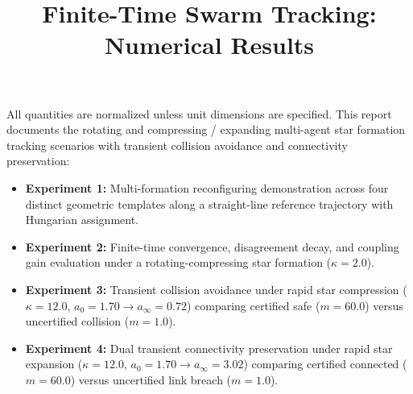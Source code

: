 \documentclass[10pt]{article}
\title{Finite-Time Swarm Tracking: Numerical Results}
\author{}\date{}
\begin{document}
\maketitle\vspace{-2em}

All quantities are normalized unless unit dimensions are specified. This report documents the rotating and compressing / expanding multi-agent star formation tracking scenarios with transient collision avoidance and connectivity preservation:
\begin{itemize}
\item \textbf{Experiment 1:} Multi-formation reconfiguring demonstration across four distinct geometric templates along a straight-line reference trajectory with Hungarian assignment.
\item \textbf{Experiment 2:} Finite-time convergence, disagreement decay, and coupling gain evaluation under a rotating-compressing star formation ($\kappa = 2.0$).
\item \textbf{Experiment 3:} Transient collision avoidance under rapid star compression ($\kappa = 12.0$, $a_0 = 1.70 \to a_\infty = 0.72$) comparing certified safe ($m = 60.0$) versus uncertified collision ($m = 1.0$).
\item \textbf{Experiment 4:} Dual transient connectivity preservation under rapid star expansion ($\kappa = 12.0$, $a_0 = 1.70 \to a_\infty = 3.02$) comparing certified connected ($m = 60.0$) versus uncertified link breach ($m = 1.0$).
\end{itemize}
\end{document}
